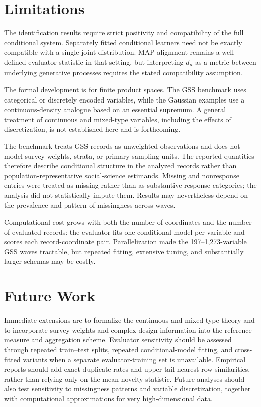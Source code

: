 \documentclass[runningheads]{llncs}
\begin{document}
\section{Limitations}

The identification results require strict positivity and compatibility of the
full conditional system. Separately fitted conditional learners need not be
exactly compatible with a single joint distribution. MAP alignment remains a
well-defined evaluator statistic in that setting, but interpreting $d_\mu$ as a
metric between underlying generative processes requires the stated compatibility
assumption.

The formal development is for finite product spaces. The GSS benchmark uses
categorical or discretely encoded variables, while the Gaussian examples use a
continuous-density analogue based on an essential supremum. A general treatment
of continuous and mixed-type variables, including the effects of discretization,
is not established here and is forthcoming.

The benchmark treats GSS records as unweighted observations and does not model
survey weights, strata, or primary sampling units. The reported quantities
therefore describe conditional structure in the analyzed records rather than
population-representative social-science estimands. Missing and nonresponse
entries were treated as missing rather than as substantive response categories;
the analysis did not statistically impute them. Results may nevertheless depend
on the prevalence and pattern of missingness across waves.

Computational cost grows with both the number of coordinates and the number of
evaluated records: the evaluator fits one conditional model per variable and
scores each record-coordinate pair. Parallelization made the 197--1,273-variable
GSS waves tractable, but repeated fitting, extensive tuning, and substantially
larger schemas may be costly.

\section{Future Work}

Immediate extensions are to formalize the continuous and mixed-type theory and
to incorporate survey weights and complex-design information into the reference
measure and aggregation scheme. Evaluator sensitivity should be assessed through
repeated train--test splits, repeated conditional-model fitting, and cross-fitted
variants when a separate evaluator-training set is unavailable. Empirical reports
should add exact duplicate rates and upper-tail nearest-row similarities, rather
than relying only on the mean novelty statistic. Future analyses should also test
sensitivity to missingness patterns and variable discretization, together with
computational approximations for very high-dimensional data.
\end{document}
